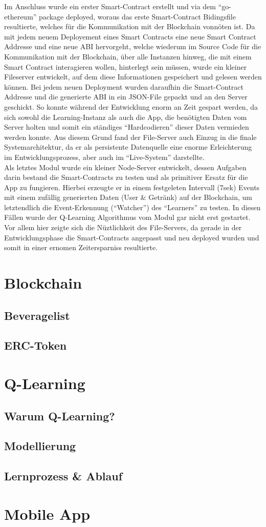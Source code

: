 Im Anschluss wurde ein erster Smart-Contract erstellt und via dem “go-ethereum” package deployed, woraus das erste Smart-Contract Bidingsfile resultierte, welches für die Kommunikation mit der Blockchain vonnöten ist. Da mit jedem neuem Deployement eines Smart Contracts eine neue Smart Contract Addresse und eine neue ABI hervorgeht, welche wiederum im Source Code für die Kommunikation mit der Blockchain, über alle Instanzen hinweg, die mit einem Smart Contract interagieren wollen, hinterlegt sein müssen, wurde ein kleiner Fileserver entwickelt, auf dem diese Informationen gespeichert und gelesen werden können. Bei jedem neuen Deployment wurden daraufhin die Smart-Contract Addresse und die generierte ABI in ein JSON-File gepackt und an den Server geschickt. So konnte während der Entwicklung enorm an Zeit gespart werden, da sich sowohl die Learning-Instanz als auch die App, die benötigten Daten vom Server holten und somit ein ständiges “Hardcodieren” dieser Daten vermieden werden konnte. Aus diesem Grund fand der File-Server auch Einzug in die finale Systemarchitektur, da er als persistente Datenquelle eine enorme Erleichterung im Entwicklungsprozess, aber auch im “Live-System” darstellte.\\
Als letztes Modul wurde ein kleiner Node-Server entwickelt, dessen Aufgaben darin bestand die Smart-Contracts zu testen und als primitiver Ersatz für die App zu fungieren. Hierbei erzeugte er in einem festgeleten Intervall (7sek) Events mit einem zufällig generierten Daten (User & Getränk) auf der Blockchain, um letztendlich die Event-Erkennung (“Watcher”) des “Learners” zu testen. In diesen Fällen wurde der Q-Learning Algorithmus vom Modul gar nicht erst gestartet. \\
Vor allem hier zeigte sich die Nüztlichkeit des File-Servers, da gerade in der Entwicklungsphase die Smart-Contracts angepasst und neu deployed wurden und somit in einer ernomen Zeitersparniss resultierte.

\section{Blockchain}
\subsection{Beveragelist}
\subsection{ERC-Token}

\section{Q-Learning}
\subsection{Warum Q-Learning?}
\subsection{Modellierung}
\subsection{Lernprozess \& Ablauf}

\section{Mobile App}


